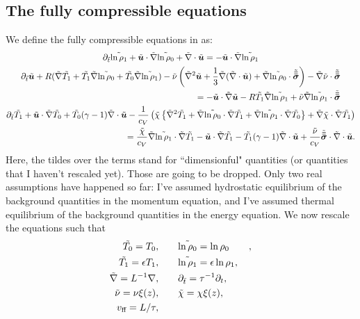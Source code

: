 \subsection{The fully compressible equations}
We define the fully compressible equations in \citet{anders&brown2017} as:
\begin{gather}
\partial_{\tilde{t}} \tilde{\ln \rho_1} + \tilde{\bm{u}}\cdot\tilde{\nabla} \tilde{\ln\rho_0} + \tilde{\nabla}\cdot\tilde{\bm{u}} = -\tilde{\bm{u}}\cdot\tilde{\nabla}\tilde{\ln\rho_1} 
\label{eqn:unscaled_continuity}
\\
\begin{split}
\partial_{\tilde{t}} \tilde{\bm{u}} + R(\tilde{\nabla} \tilde{T_1} + \tilde{T_1} \tilde{\nabla}\tilde{\ln\rho_0} + \tilde{T_0} \tilde{\nabla}\tilde{\ln\rho_1})
- \tilde{\nu}\left(\tilde{\nabla}^2 \tilde{\bm{u}} + \frac{1}{3}\tilde{\nabla}(\tilde{\nabla}\cdot\tilde{\bm{u}}) + \tilde{\nabla}\tilde{\ln\rho_0}\cdot\tilde{\bm{\bar{\bar{\sigma}}}}\right)
- \tilde{\nabla}\tilde{\nu}\cdot\tilde{\bm{\bar{\bar{\sigma}}}}
\\= -\tilde{\bm{u}}\cdot\tilde{\nabla}\tilde{\bm{u}} - R\tilde{T_1}\tilde{\nabla}\tilde{\ln\rho_1} + \tilde{\nu}\tilde{\nabla}\tilde{\ln\rho_1}\cdot\tilde{\bm{\bar{\bar{\sigma}}}}
\end{split}
\label{eqn:unscaled_momentum}
\\
\begin{split}
\partial_{\tilde{t}} \tilde{T_1} + \tilde{\bm{u}}\cdot\tilde{\nabla} \tilde{T_0} + \tilde{T_0}(\gamma-1)\tilde{\nabla}\cdot\tilde{\bm{u}} 
- \frac{1}{c_V}\left(\tilde{\chi}\left\{\tilde{\nabla}^2 \tilde{T_1} + \tilde{\nabla}\tilde{\ln\rho_0} \cdot\tilde{\nabla} \tilde{T_1} + \tilde{\nabla}\tilde{\ln\rho_1}\cdot\tilde{\nabla} \tilde{T_0}\right\} 
+ \tilde{\nabla}\tilde{\chi}\cdot\tilde{\nabla} \tilde{T_1}\right)
\\= \frac{\tilde{\chi}}{c_V}\tilde{\nabla}\tilde{\ln\rho_1}\cdot\tilde{\nabla} \tilde{T_1} - \tilde{\bm{u}}\cdot\tilde{\nabla} \tilde{T_1} - \tilde{T_1}(\gamma-1)\tilde{\nabla}\cdot\tilde{\bm{u}}
+ \frac{\tilde{\nu}}{c_V}\tilde{\bm{\bar{\bar{\sigma}}}}\cdot\tilde{\nabla}\cdot\tilde{\bm{u}}.
\end{split}
\label{eqn:unscaled_energy}
\end{gather}
Here, the tildes over the terms stand for ``dimensionful" quantities (or quantities that I haven't
rescaled yet). Those are going to be dropped. Only two real assumptions have happened so far:
I've assumed hydrostatic equilibrium of the background quantities in the momentum equation,
and I've assumed thermal equilibrium of the background quantities in the energy equation.
We now rescale the equations such that
\begin{equation}
\begin{split}
\td{T_0} =  T_0, 		\qquad &\td{\ln\rho_0} = \ln\rho_0\qquad, \\
\td{T_1} = \epsilon T_1, \qquad &\td{\ln\rho_1} = \epsilon\ln\rho_1, \\
\td{\grad} = L^{-1}\grad,  		\qquad &\partial_{\td{t}} = \tau^{-1}\partial_t, \\
\td{\nu} = \nu\xi(z),				\qquad &\td{\chi} = \chi\xi(z),\\
v_{\ff} = L/\tau, \qquad &%
\end{split}
\end{equation}

